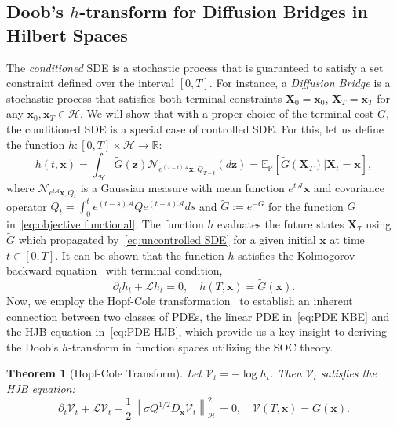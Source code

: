 \documentclass[nohyperref]{article}
\theoremstyle{plain}
\newtheorem{theorem}{Theorem}[section]
\theoremstyle{remark}
\newcommand{\mc}{\mathcal}
\newcommand{\mb}{\mathbf}
\newcommand{\norm}[1]{\left\lVert#1\right\rVert}
\begin{document}
\subsection{Doob's  \texorpdfstring{$h$}{h}-transform for Diffusion Bridges in Hilbert Spaces}

The \textit{conditioned} SDE is a stochastic process that is guaranteed to satisfy a set constraint defined over the interval $[0, T]$. 
For instance, a \textit{Diffusion Bridge} is a stochastic process that satisfies both terminal constraints $\mathbf{X}_0 = \mathbf{x}_0$, $\mathbf{X}_T = \mathbf{x}_T$ for any $\mathbf{x}_0, \mathbf{x}_T \in \mathcal{H}$. We will show that with a proper choice of the terminal cost $G$, the conditioned SDE is a special case of controlled SDE. 
For this, let us define the function $h : [0, T] \times \mc{H} \to \mathbb{R}$:
\begin{equation}\label{eq:h function}
    h(t, \mb{x}) = \int_{\mc{H}} \tilde{G}(\mb{z}) \mc{N}_{e^{(T-t)\mc{A}}\mb{x}, Q_{T-t}}(d\mb{z}) = \mathbb{E}_{\mathbb{P}}\left[ \tilde{G}(\mb{X}_T)|\mb{X}_t=\mb{x}\right],
\end{equation}
where $\mc{N}_{e^{t\mc{A}}\mb{x}, Q_{t}}$ is a Gaussian measure with mean function $e^{t\mc{A}}\mb{x}$ and covariance operator $Q_{t} = \int_0^{t} e^{(t-s)\mc{A}} Q e^{(t-s)\mc{A}}ds$ and $\tilde{G} := e^{-G}$ for the function $G$ in~\eqref{eq:objective functional}. 
The function $h$ evaluates the future states $\mb{X}_T$ using $\tilde{G}$ which propagated by~\eqref{eq:uncontrolled SDE} for a given initial $\mb{x}$ at time $t \in [0, T]$. 
It can be shown that the function $h$ satisfies the Kolmogorov-backward equation~\citep{da2014stochastic} with terminal condition,
\begin{equation}\label{eq:PDE KBE}
    \partial_t h_t + \mc{L}h_t=0, \quad h(T, \mb{x}) = \tilde{G}(\mb{x}).
\end{equation}
Now, we employ the Hopf-Cole transformation~\citep{fleming2006controlled} to establish an inherent connection between two classes of PDEs,  the linear PDE in~\eqref{eq:PDE KBE} and the HJB equation in~\eqref{eq:PDE HJB}, which provide us a key insight to deriving the Doob's $h$-transform in function spaces utilizing the SOC theory.
\begin{theorem}[Hopf-Cole Transform]\label{Theorem:Hopf-Cole}  Let $\mc{V}_t = -\log h_t$. Then $\mc{V}_t$ satisfies the HJB equation:
\begin{equation}\label{eq:PDE HJB optimal}
    \partial_t \mc{V}_t + \mc{L} \mc{V}_t -\frac{1}{2}\norm{\sigma Q^{1/2}D_{\mb{x}} \mc{V}_t }^2_{\mc{H}} = 0, \quad \mc{V}(T, \mb{x}) = G(\mb{x}).
\end{equation}
\end{theorem}
\end{document}

